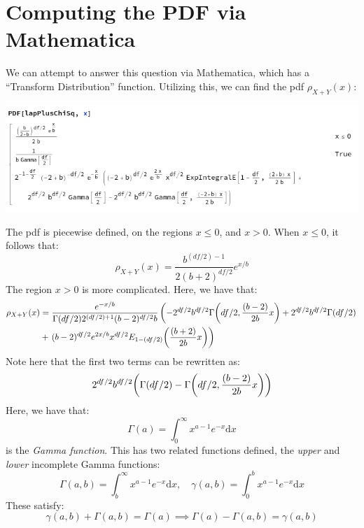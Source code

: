 \documentclass{article}
\begin{document}
\section{Computing the PDF via Mathematica}
We can attempt to answer this question via Mathematica, which has a ``Transform Distribution'' function.
Utilizing this, we can find the pdf $\rho_{X+Y}(x)$:
\begin{center}
\includegraphics[scale=.5]{pdf.png}
\end{center}
The pdf is piecewise defined, on the regions $x \leq 0$, and $x > 0$.
When $x \leq 0$, it follows that:
\begin{equation}
\rho_{X+Y}(x) = \frac{b^{(df/2)-1}}{2(b+2)^{df/2}}e^{x/b}
\end{equation}
The region $x > 0$ is more complicated.
Here, we have that:
\begin{align*}
\rho_{X+Y}(x) &=\frac{e^{-x/b}}{\Gamma(df/2)2^{(df/2)+1}(b-2)^{df/2}b}\left(-2^{df/2}b^{df/2}\Gamma\pqty{df/2,\frac{(b-2)}{2b}x} + 2^{df/2}b^{df/2}\Gamma(df/2)\right. \\
&+\left.(b-2)^{df/2}e^{2x/b}x^{df/2}E_{1-(df/2)}\pqty{\frac{(b+2)}{2b}x}\right)
\end{align*}
Note here that the first two terms can be rewritten as:
\begin{equation}
2^{df/2}b^{df/2}\pqty{\Gamma(df/2)-\Gamma\pqty{df/2, \frac{(b-2)}{2b}x}}
\end{equation}
Here, we have that:
\begin{equation}
\Gamma(a) = \int_0^\infty x^{a-1}e^{-x}\mathrm{ d}x
\end{equation}
is the \emph{Gamma function}.
This has two related functions defined, the \emph{upper} and \emph{lower} incomplete Gamma functions:
\begin{equation}
\Gamma(a,b) = \int_b^\infty x^{a-1}e^{-x}\mathrm{d}x,\quad \gamma(a,b) = \int_0^b x^{a-1}e^{-x}\mathrm{d}x
\end{equation}
These satisfy:
\begin{equation}
\gamma(a,b) + \Gamma(a,b) = \Gamma(a)\implies \Gamma(a) - \Gamma(a,b) = \gamma(a,b)
\end{equation}
\end{document}
